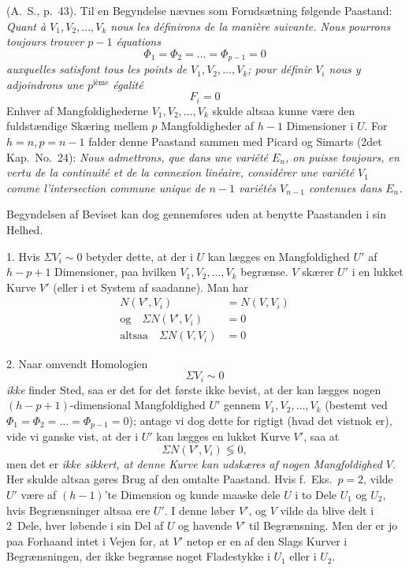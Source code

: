 \documentclass{article}
\begin{document}
(A.~S., p.\ 43). Til en Begyndelse nævnes som Forudsætning følgende Paastand: \emph{Quant à $V_1, V_2, \dots, V_k$ nous les définirons de la manière suivante. Nous pourrons toujours trouver $p - 1$ équations}
\[
\Phi_1 = \Phi_2 = \dots = \Phi_{p-1} = 0
\]
\emph{auxquelles satisfont tous les points de $V_1, V_2, \dots, V_k$; pour définir $V_i$ nous y adjoindrons une $p^{\text{ième}}$ égalité}
\[
F_i = 0
\]
Enhver af Mangfoldighederne $V_1, V_2, \dots, V_k$ skulde altsaa kunne være den fuldstændige Skæring mellem $p$ Mangfoldigheder af $h - 1$ Dimensioner i $U$. For $h = n, p = n - 1$ falder denne Paastand sammen med Picard og Simarts (2det Kap.\ No.\ 24): \emph{Nous admettrons, que dans une variété $E_n$, on puisse toujours, en vertu de la continuité et de la connexion linéaire, considérer une variété $V_1$ comme l'intersection commune unique de $n - 1$ variétés $V_{n-1}$ contenues dans $E_n$.}

Begyndelsen af Beviset kan dog gennemføres uden at benytte Paastanden i sin Helhed.

1. Hvis $\Sigma V_i \sim 0$ betyder dette, at der i $U$ kan lægges en Mangfoldighed $U'$ af $h - p + 1$ Dimensioner, paa hvilken $V_1, V_2, \dots, V_k$ begrænse. $V$ skærer $U'$ i en lukket Kurve $V'$ (eller i et System af saadanne). Man har
\[
\begin{aligned}
N(V', V_i) &= N(V, V_i) \\
\text{og} \quad \Sigma N(V', V_i) &= 0 \\
\text{altsaa} \quad \Sigma N(V, V_i) &= 0
\end{aligned}
\]

2. Naar omvendt Homologien
\[
\Sigma V_i \sim 0
\]
\emph{ikke} finder Sted, saa er det for det første ikke bevist, at der kan lægges nogen $(h - p + 1)$-dimensional Mangfoldighed $U'$ gennem $V_1, V_2, \dots, V_k$ (bestemt ved $\Phi_1 = \Phi_2 = \dots = \Phi_{p-1} = 0$); antage vi dog dette for rigtigt (hvad det vistnok er), vide vi ganske vist, at der i $U'$ kan lægges en lukket Kurve $V'$, saa at
\[
\Sigma N(V', V_i) \lessgtr 0,
\]
men det er \emph{ikke sikkert, at denne Kurve kan udskæres af nogen Mangfoldighed $V$}. Her skulde altsaa gøres Brug af den omtalte Paastand. Hvis f.~Eks.\ $p = 2$, vilde $U'$ være af $(h - 1)$'te Dimension og kunde maaske dele $U$ i to Dele $U_1$ og $U_2$, hvis Begrænsninger altsaa ere $U'$. I denne løber $V'$, og $V$ vilde da blive delt i 2~Dele, hver løbende i sin Del af $U$ og havende $V'$ til Begrænsning. Men der er jo paa Forhaand intet i Vejen for, at $V'$ netop er en af den Slags Kurver i Begrænsningen, der ikke begrænse noget Fladestykke i $U_1$ eller i $U_2$.
\end{document}
